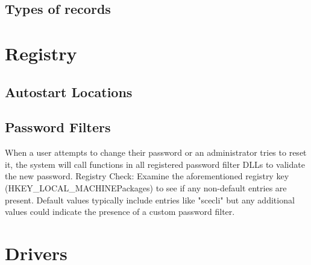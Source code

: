 \subsection{Types of records}

\section{Registry}
\subsection{Autostart Locations}
\subsection{Password Filters}
When a user attempts to change their password or an administrator tries to reset it, the system will call functions in all registered password filter DLLs to validate the new password.
Registry Check: Examine the aforementioned registry key (HKEY_LOCAL_MACHINE\SYSTEM\CurrentControlSet\Control\Lsa\Notification Packages) to see if any non-default entries are present. Default values typically include entries like "scecli" but any additional values could indicate the presence of a custom password filter.

\section{Drivers}